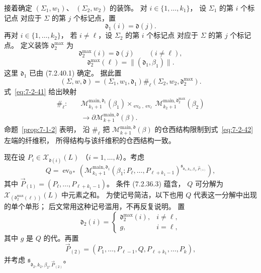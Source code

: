接着确定 $(\Sigma_1,w_1)$、
$(\Sigma_2,w_2)$ 的装饰。
对 $i\in\{1,\ldots,k_1\}$，
设 $\Sigma_1$ 的第 $i$ 个标记点
对应于 $\Sigma$ 的第 $j$ 个标记点，置
\begin{equation}
\mathfrak d_1(i)=\mathfrak d(j).
\tag{7.2.40.1}\label{eq:7-2-40-1}
\end{equation}
再对 $i\in\{1,\ldots,k_2\}$，
若 $i\ne\ell$，设 $\Sigma_2$ 的第 $i$ 个标记点
对应于 $\Sigma$ 的第 $j$ 个标记点。
定义装饰 $\mathfrak d_2^{\max}$ 为
\begin{equation}
\mathfrak d_2^{\max}(i)=\mathfrak d(j)
\qquad(i\ne\ell),
\tag{7.2.40.2}\label{eq:7-2-40-2}
\end{equation}
\begin{equation}
\mathfrak d_2^{\max}(\ell)
=\|(\mathfrak d_1,\beta_1)\|.
\tag{7.2.40.3}\label{eq:7-2-40-3}
\end{equation}
这里 $\mathfrak d_1$ 已由 (7.2.40.1) 确定。
据此置
\begin{equation}
(\Sigma,w,\mathfrak d)
=(\Sigma_1,w_1,\mathfrak d_1)
\mathbin{\#_\ell}
(\Sigma_2,w_2,\mathfrak d_2^{\max}).
\tag{7.2.41}\label{eq:7-2-41}
\end{equation}
式~\eqref{eq:7-2-41} 给出映射
\begin{equation}
\begin{aligned}
\#_\ell\colon\quad
&\mathcal M^{\mathrm{main},\mathfrak d_1}_{k_1+1}(\beta_1)
\mathop{\times}_{\operatorname{ev}_0,\operatorname{ev}_\ell}
\mathcal M^{\mathrm{main},\mathfrak d_2^{\max}}_{k_2+1}(\beta_2)\\
&\longrightarrow
\partial\mathcal M^{\mathrm{main},\mathfrak d}_{k+1}(\beta).
\end{aligned}
\tag{7.2.42}\label{eq:7-2-42}
\end{equation}
命题~\ref{prop:7-1-2} 表明，
沿 $\#_\ell$ 把
$\mathcal M^{\mathrm{main},\mathfrak d}_{k+1}(\beta)$
的仓西结构限制到式~\eqref{eq:7-2-42} 左端的纤维积，
所得结构与该纤维积的仓西结构一致。

现在设
$P_i\in\mathcal X_{\mathfrak d(i)}(L)$
（$i=1,\ldots,k$）。考虑
\[
Q=\operatorname{ev}_{0*}\left(
\mathcal M^{\mathrm{main},\mathfrak d_1}_{k_1+1}
(\beta_1;P_\ell,\ldots,P_{\ell+k_1-1})
^{\mathfrak s_{\mathfrak d_1,k_1,\beta_1,\vec P_{(1)}}}
\right),
\]
其中
$\vec P_{(1)}=(P_\ell,\ldots,P_{\ell+k_1-1})$。
条件 (7.2.36.3) 蕴含，
$Q$ 可分解为
$\mathcal X_{(\mathfrak d_2^{\max}(\ell))}(L)$
中元素之和。
为使记号简洁，以下也用 $Q$
代表这一分解中出现的单个单形；
后文常用这种记号滥用，不再反复说明。
置
\begin{equation}
\mathfrak d_2(i)=
\begin{cases}
\mathfrak d_2^{\max}(i),&i\ne\ell,\\
g,&i=\ell,
\end{cases}
\tag{7.2.43}\label{eq:7-2-43}
\end{equation}
其中 $g$ 是 $Q$ 的代。再置
\[
\vec P_{(2)}
=(P_1,\ldots,P_{\ell-1},Q,
P_{\ell+k_1},\ldots,P_k),
\]
并考虑
$\mathfrak s_{\mathfrak d_2,k_2,\beta_2,\vec P_{(2)}}$。


